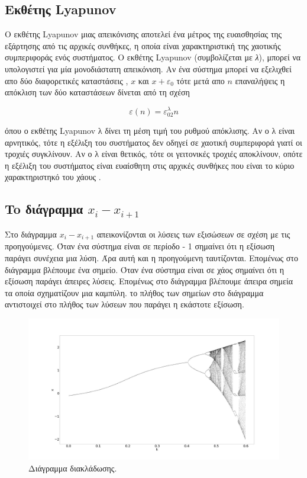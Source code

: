 \subsection{Εκθέτης Lyapunov}
Ο εκθέτης Lyapunov μιας απεικόνισης αποτελεί ένα μέτρος της ευαισθησίας της εξάρτησης από τις αρχικές συνθήκες, η οποία είναι χαρακτηριστική της χαοτικής συμπεριφοράς ενός συστήματος. Ο εκθέτης Lyapunov (συμβολίζεται με \emph{λ}), μπορεί να υπολογιστεί για μία μονοδιάστατη απεικόνιση. Αν ένα σύστημα μπορεί να εξελιχθεί απο δύο διαφορετικές καταστάσεις , $x$ και $ x + ε_0$ τότε μετά απο $n$ επαναλήψεις η απόκλιση των δύο καταστάσεων δίνεται από τη σχέση

\begin{equation}
	ε(n) = ε_02^λn
\end{equation}

όπου ο εκθέτης Lyapunov λ δίνει τη μέση τιμή του ρυθμού απόκλισης. Αν ο λ είναι αρνητικός, τότε η εξέλιξη του συστήματος δεν οδηγεί σε χαοτική συμπεριφορά γιατί οι τροχιές συγκλίνουν. Αν ο λ είναι θετικός, τότε οι γειτονικές τροχιές αποκλίνουν, οπότε η εξέλιξη του συστήματος είναι ευαίσθητη στις αρχικές συνθήκες που είναι το κύριο χαρακτηριστηκό του χάους \cite{b5}.

\subsection{To διάγραμμα $x_i - x_{i+1}$}

Στο διάγραμμα $x_i - x_{i+1}$ απεικονίζονται οι λύσεις των εξισώσεων σε σχέση με τις προηγούμενες. Όταν ένα σύστημα είναι σε περίοδο - 1 σημαίνει ότι η εξίσωση παράγει συνέχεια μια λύση. Άρα αυτή και η προηγούμενη ταυτίζονται. Επομένως στο διάγραμμα βλέπουμε ένα σημείο. Όταν  ένα σύστημα είναι σε χάος σημαίνει ότι η εξίσωση παράγει άπειρες λύσεις. Επομένως στο διάγραμμα βλέπουμε άπειρα σημεία τα οποία σχηματίζουν μια καμπύλη. το πλήθος των σημείων στο διάγραμμα αντιστοιχεί στο πλήθος των λύσεων που παράγει η εκάστοτε εξίσωση.
\begin{figure}[ht]
	\centering
	\includegraphics[width=1\linewidth]{LateX images/graphs/g1}
	\caption{ Διάγραμμα διακλάδωσης.}
	\label{th:g1}	
\end{figure}

